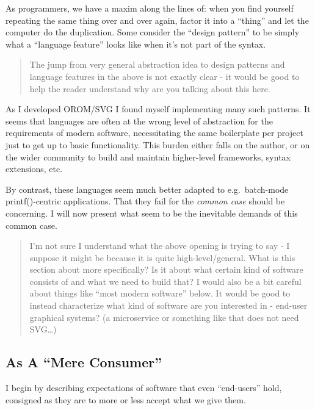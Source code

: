 \documentclass[english,submission]{programming}
\begin{document}
  As programmers, we have a maxim along the lines of: when you find
  yourself repeating the same thing over and over again, factor it into a
  ``thing'' and let the computer do the duplication. Some consider the
  ``design pattern'' to be simply what a ``language feature'' looks like
  when it's not part of the syntax.

  \begin{quote}
  The jump from very general abstraction idea to design patterns and
  language features in the above is not exactly clear - it would be good
  to help the reader understand why are you talking about this here.
  \end{quote}

  As I developed OROM/SVG I found myself implementing many such patterns.
  It seems that languages are often at the wrong level of abstraction for
  the requirements of modern software, necessitating the same boilerplate
  per project just to get up to basic functionality. This burden either
  falls on the author, or on the wider community to build and maintain
  higher-level frameworks, syntax extensions, etc.

  By contrast, these languages seem much better adapted to e.g.~batch-mode
  printf()-centric applications. That they fail for the \emph{common case}
  should be concerning. I will now present what seem to be the inevitable
  demands of this common case.

  \begin{quote}
  I'm not sure I understand what the above opening is trying to say - I
  suppose it might be because it is quite high-level/general. What is this
  section about more specifically? Is it about what certain kind of
  software consists of and what we need to build that? I would also be a
  bit careful about things like ``most modern software'' below. It would
  be good to instead characterize what kind of software are you interested
  in - end-user graphical systems? (a microservice or something like that
  does not need SVG\ldots{})
  \end{quote}

  \hypertarget{as-a-mere-consumer}{%
  \subsection{As A ``Mere Consumer''}\label{as-a-mere-consumer}}

  I begin by describing expectations of software that even ``end-users''
  hold, consigned as they are to more or less accept what we give them.
\end{document}
